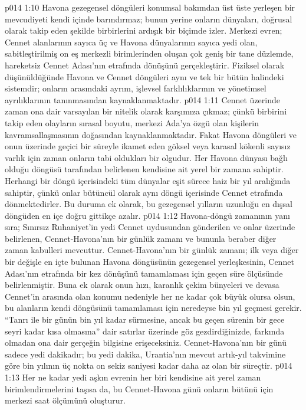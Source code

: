 \vs p014 1:10 Havona gezegensel döngüleri konumsal bakımdan üst üste yerleşen bir mevcudiyeti kendi içinde barındırmaz; bunun yerine onların dünyaları, doğrusal olarak takip eden şekilde birbirlerini ardışık bir biçimde izler. Merkezi evren; Cennet alanlarının sayıca üç ve Havona dünyalarının sayıca yedi olan, sabitleştirilmiş on eş merkezli birimlerinden oluşan çok geniş bir tane düzlemde, hareketsiz Cennet Adası’nın etrafında dönüşünü gerçekleştirir. Fiziksel olarak düşünüldüğünde Havona ve Cennet döngüleri aynı ve tek bir bütün halindeki sistemdir; onların arasındaki ayrım, işlevsel farklılıklarının ve yönetimsel ayrılıklarının tanınmasından kaynaklanmaktadır.
\vs p014 1:11 Cennet üzerinde zaman ona dair varsayılan bir nitelik olarak karşımıza çıkmaz; çünkü birbirini takip eden olayların sırasal boyutu, merkezi Ada’ya özgü olan kişilerin kavramsallaşmasının doğasından kaynaklanmaktadır. Fakat Havona döngüleri ve onun üzerinde geçici bir süreyle ikamet eden göksel veya karasal kökenli sayısız varlık için zaman onların tabi oldukları bir olgudur. Her Havona dünyası bağlı olduğu döngüsü tarafından belirlenen kendisine ait yerel bir zamana sahiptir. Herhangi bir döngü içerisindeki tüm dünyalar eşit sürece haiz bir yıl aralığında sahiptir, çünkü onlar bütüncül olarak aynı döngü içerisinde Cennet etrafında dönmektedirler. Bu duruma ek olarak, bu gezegensel yılların uzunluğu en dışsal döngüden en içe doğru gittikçe azalır.
\vs p014 1:12 Havona\hyp{}döngü zamanının yanı sıra; Sınırsız Ruhaniyet’in yedi Cennet uydusundan gönderilen ve onlar üzerinde belirlenen, Cennet\hyp{}Havona’nın bir günlük zamanı ve bununla beraber diğer zaman kabulleri mevcuttur. Cennet\hyp{}Havona’nın bir günlük zamanı; ilk veya diğer bir değişle en içte bulunan Havona döngüsünün gezegensel yerleşkesinin, Cennet Adası’nın etrafında bir kez dönüşünü tamamlaması için geçen süre ölçüsünde belirlenmiştir. Buna ek olarak onun hızı, karanlık çekim bünyeleri ve devasa Cennet’in arasında olan konumu nedeniyle her ne kadar çok büyük olursa olsun, bu alanların kendi döngüsünü tamamlaması için neredeyse bin yıl geçmesi gerekir. “Tanrı ile bir günün bin yıl kadar sürmesine, ancak bu geçen sürenin bir gece seyri kadar kısa olmasına” dair satırlar üzerinde göz gezdirdiğinizde, farkında olmadan ona dair gerçeğin bilgisine erişeceksiniz. Cennet\hyp{}Havona’nın bir günü sadece yedi dakikadır; bu yedi dakika, Urantia’nın mevcut artık\hyp{}yıl takvimine göre bin yılının üç nokta on sekiz saniyesi kadar daha az olan bir süreçtir.
\vs p014 1:13 Her ne kadar yedi aşkın evrenin her biri kendisine ait yerel zaman birimlendirmelerini taşısa da, bu Cennet\hyp{}Havona günü onların bütünü için merkezi saat ölçümünü oluşturur.

